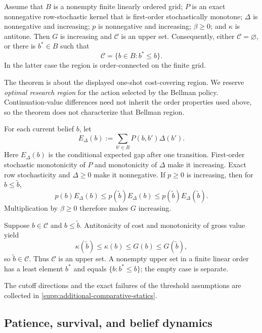\begin{theorem}
\label{thm:finite-monotone-coverage}
Assume that \(B\) is a nonempty finite linearly ordered grid; \(P\) is an
exact nonnegative row-stochastic kernel that is first-order stochastically
monotone; \(\Delta\) is nonnegative and increasing; \(p\) is nonnegative and
increasing; \(\beta\ge0\); and \(\kappa\) is antitone.  Then \(G\) is
increasing and \(\mathcal C\) is an upper set.  Consequently, either
\(\mathcal C=\varnothing\), or there is \(b^*\in B\) such that
\begin{equation}\label{eq:finite-upper-threshold}
  \mathcal C=\{b\in B:b^*\le b\}.
\end{equation}
In the latter case the region is order-connected on the finite grid.
\end{theorem}

The theorem is about the displayed one-shot cost-covering region.  We reserve
\emph{optimal research region} for the action selected by the Bellman policy.
Continuation-value differences need not inherit the order properties used
above, so the theorem does not characterize that Bellman region.

For each current belief \(b\), let
\[
 E_\Delta(b):=\sum_{b'\in B}P(b,b')\Delta(b').
\]
Here \(E_\Delta(b)\) is the conditional expected gap after one transition.
First-order stochastic monotonicity of \(P\) and monotonicity of \(\Delta\)
make it increasing.  Exact row stochasticity and \(\Delta\ge0\) make it
nonnegative.  If \(p\ge0\) is increasing, then for
\(b\le\widetilde b\),
\[
 p(b)E_\Delta(b)
 \le p(\widetilde b)E_\Delta(b)
 \le p(\widetilde b)E_\Delta(\widetilde b).
\]
Multiplication by \(\beta\ge0\) therefore makes \(G\) increasing.

Suppose \(b\in\mathcal C\) and \(b\le\widetilde b\).  Antitonicity of cost
and monotonicity of gross value yield
\[
 \kappa(\widetilde b)
 \le\kappa(b)
 \le G(b)
 \le G(\widetilde b),
\]
so \(\widetilde b\in\mathcal C\).  Thus \(\mathcal C\) is an upper set.  A
nonempty upper set in a finite linear order has a least element \(b^*\) and
equals \(\{b:b^*\le b\}\); the empty case is separate.

The cutoff directions and the exact failures of the threshold assumptions
are collected in \cref{supp:additional-comparative-statics}.

\subsection{Patience, survival, and belief dynamics}

